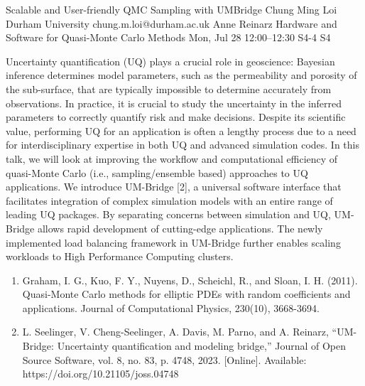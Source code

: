 \begin{talk}
  {Scalable and User-friendly QMC Sampling with UMBridge}%
  {Chung Ming Loi}%
  {Durham University}%
  {chung.m.loi@durham.ac.uk}%
  {Anne Reinarz}%
  {Hardware and Software for Quasi-Monte Carlo Methods}%
  {Mon, Jul 28 12:00--12:30}%
  {S4-4}%
  {S4}%
    
   
Uncertainty quantification (UQ) plays a crucial role in geoscience: Bayesian inference determines model parameters, such as the permeability and porosity of the sub-surface, that are typically impossible to determine accurately from observations. In practice, it is crucial to study the uncertainty in the inferred parameters to correctly quantify risk and make decisions. Despite its scientific value, performing UQ for an application is often a lengthy process due to a need for interdisciplinary expertise in both UQ and advanced simulation codes. In this talk, we will look at improving the workflow and computational efficiency of quasi-Monte Carlo (i.e., sampling/ensemble based) approaches to UQ applications. We introduce UM-Bridge [2], a universal software interface that facilitates integration of complex simulation models with an entire range of leading UQ packages. By separating concerns between simulation and UQ, UM-Bridge allows rapid development of cutting-edge applications. The newly implemented load balancing framework in UM-Bridge further enables scaling workloads to High Performance Computing clusters.

\begin{enumerate}
    \item[{[1]}] Graham, I. G., Kuo, F. Y., Nuyens, D., Scheichl, R., and Sloan, I. H. (2011). Quasi-Monte Carlo methods for elliptic PDEs with random coefficients and applications. Journal of Computational Physics, 230(10), 3668-3694.
    \item[{[2]}]  L. Seelinger, V. Cheng-Seelinger, A. Davis, M. Parno, and A. Reinarz, “UM-Bridge: Uncertainty quantification and modeling bridge,” Journal of Open Source Software, vol. 8, no. 83, p. 4748, 2023. [Online]. Available: https://doi.org/10.21105/joss.04748
\end{enumerate}

\end{talk}

